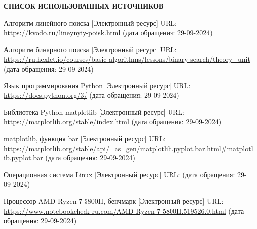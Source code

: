\renewcommand{\bibname}{}
\begin{thebibliography}{6}
\renewcommand{\bibname}{СПИСОК ИСПОЛЬЗОВАННЫХ ИСТОЧНИКОВ}
\begin{center}
    \textbf{\bibname}
\end{center}
        Алгоритм линейного поиска [Электронный ресурс]
        URL: \url{https://kvodo.ru/lineynyiy-poisk.html}
        (дата обращения: 29-09-2024)

        Алгоритм бинарного поиска [Электронный ресурс]
        URL: \url{https://ru.hexlet.io/courses/basic-algorithms/lessons/binary-search/theory_unit}
        (дата обращения: 29-09-2024)

        Язык программирования Python [Электронный ресурс]
        URL: \url{https://docs.python.org/3/}
        (дата обращения: 29-09-2024)
    
        Библиотека Python matplotlib [Электронный ресурс]
        URL: \url{https://matplotlib.org/stable/index.html}
        (дата обращения: 29-09-2024)

        matplotlib, функция bar [Электронный ресурс]
        URL: \url{https://matplotlib.org/stable/api/_as_gen/matplotlib.pyplot.bar.html#matplotlib.pyplot.bar}
        (дата обращения: 29-09-2024)

        Операционная система Linux [Электронный ресурс]
        URL: 
        (дата обращения: 29-09-2024)
    
        Процессор AMD Ryzen 7 5800H, бенчмарк [Электронный ресурс]
        URL: \url{https://www.notebookcheck-ru.com/AMD-Ryzen-7-5800H.519526.0.html}
        (дата обращения: 29-09-2024)

\end{thebibliography}

